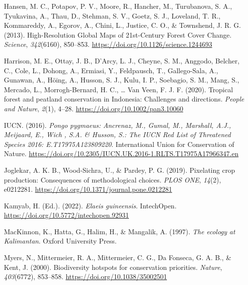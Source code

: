 \documentclass[
  letterpaper,
  DIV=11,
  numbers=noendperiod]{scrreprt}
\newlength{\cslhangindent}
\newlength{\cslentryspacingunit} %
\newenvironment{CSLReferences}[2] %
 {%
  \setlength{\parindent}{0pt}
  \ifodd #1
  \let\oldpar\par
  \def\par{\hangindent=\cslhangindent\oldpar}
  \fi
  \setlength{\parskip}{#2\cslentryspacingunit}
 }%
 {}
\begin{document}
\begin{CSLReferences}{1}{0}
\leavevmode{}%
Hansen, M. C., Potapov, P. V., Moore, R., Hancher, M., Turubanova, S.
A., Tyukavina, A., Thau, D., Stehman, S. V., Goetz, S. J., Loveland, T.
R., Kommareddy, A., Egorov, A., Chini, L., Justice, C. O., \& Townshend,
J. R. G. (2013). High-{Resolution Global Maps} of 21st-{Century Forest
Cover Change}. \emph{Science}, \emph{342}(6160), 850--853.
\url{https://doi.org/10.1126/science.1244693}

\leavevmode{}%
Harrison, M. E., Ottay, J. B., D'Arcy, L. J., Cheyne, S. M., Anggodo,
Belcher, C., Cole, L., Dohong, A., Ermiasi, Y., Feldpausch, T.,
Gallego-Sala, A., Gunawan, A., Höing, A., Husson, S. J., Kulu, I. P.,
Soebagio, S. M., Mang, S., Mercado, L., Morrogh-Bernard, H. C., \ldots{}
Van Veen, F. J. F. (2020). Tropical forest and peatland conservation in
{Indonesia}: {Challenges} and directions. \emph{People and Nature},
\emph{2}(1), 4--28. \url{https://doi.org/10.1002/pan3.10060}

\leavevmode{}%
IUCN. (2016). \emph{Pongo pygmaeus: {Ancrenaz}, {M}., {Gumal}, {M}.,
{Marshall}, {A}.{J}., {Meijaard}, {E}., {Wich} , {S}.{A}. \& {Husson},
{S}.: {The IUCN Red List} of {Threatened Species} 2016:
E.{T17975A123809220}}. {International Union for Conservation of Nature}.
\url{https://doi.org/10.2305/IUCN.UK.2016-1.RLTS.T17975A17966347.en}

\leavevmode{}%
Joglekar, A. K. B., Wood-Sichra, U., \& Pardey, P. G. (2019). Pixelating
crop production: {Consequences} of methodological choices. \emph{PLOS
ONE}, \emph{14}(2), e0212281.
\url{https://doi.org/10.1371/journal.pone.0212281}

\leavevmode{}%
Kamyab, H. (Ed.). (2022). \emph{Elaeis guineensis}. {IntechOpen}.
\url{https://doi.org/10.5772/intechopen.92931}

\leavevmode{}%
MacKinnon, K., Hatta, G., Halim, H., \& Mangalik, A. (1997). \emph{The
ecology at {Kalimantan}}. {Oxford University Press}.

\leavevmode{}%
Myers, N., Mittermeier, R. A., Mittermeier, C. G., Da Fonseca, G. A. B.,
\& Kent, J. (2000). Biodiversity hotspots for conservation priorities.
\emph{Nature}, \emph{403}(6772), 853--858.
\url{https://doi.org/10.1038/35002501}


\end{CSLReferences}
\end{document}
